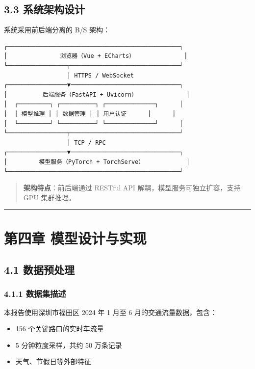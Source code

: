\documentclass{harryopo-mathnotes}
\begin{document}
\subsection{3.3
系统架构设计}\label{ux7cfbux7edfux67b6ux6784ux8bbeux8ba1}

系统采用前后端分离的 B/S 架构：

\begin{verbatim}
┌─────────────────────────────────────────────────┐
│               浏览器（Vue + ECharts）              │
└─────────────────┬───────────────────────────────┘
                  │ HTTPS / WebSocket
┌─────────────────▼───────────────────────────────┐
│          后端服务（FastAPI + Uvicorn）              │
│  ┌─────────┐ ┌──────────┐ ┌──────────────┐      │
│  │ 模型推理 │ │ 数据管理 │ │ 用户认证      │      │
│  └─────────┘ └──────────┘ └──────────────┘      │
└─────────────────┬───────────────────────────────┘
                  │ TCP / RPC
┌─────────────────▼───────────────────────────────┐
│         模型服务（PyTorch + TorchServe）            │
└─────────────────────────────────────────────────┘
\end{verbatim}

\begin{quote}
\textbf{架构特点}：前后端通过 RESTful API 解耦，模型服务可独立扩容，支持
GPU 集群推理。
\end{quote}

\begin{center}\rule{0.5\linewidth}{0.5pt}\end{center}

\section{第四章
模型设计与实现}\label{ux7b2cux56dbux7ae0-ux6a21ux578bux8bbeux8ba1ux4e0eux5b9eux73b0}

\subsection{4.1 数据预处理}\label{ux6570ux636eux9884ux5904ux7406}

\subsubsection{4.1.1 数据集描述}\label{ux6570ux636eux96c6ux63cfux8ff0}

本报告使用深圳市福田区 2024 年 1 月至 6 月的交通流量数据，包含：

\begin{itemize}
\tightlist
\item
  156 个关键路口的实时车流量
\item
  5 分钟粒度采样，共约 50 万条记录
\item
  天气、节假日等外部特征
\end{itemize}
\end{document}
